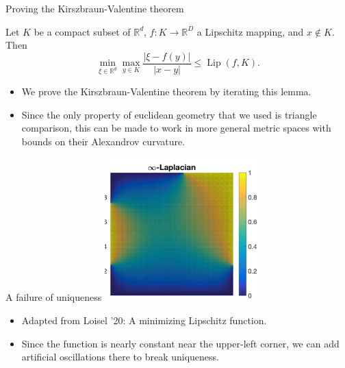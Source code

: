 \documentclass[10pt]{beamer}
\newcommand{\RR}{\mathbb{R}}
\DeclareMathOperator{\Lip}{Lip}
\begin{document}
\begin{frame}{Proving the Kirszbraun-Valentine theorem}
\begin{lemma}
Let $K$ be a compact subset of $\RR^d$, $f: K \to \RR^D$ a Lipschitz mapping, and $x \notin K$.
Then
$$\min_{\xi \in \RR^d} \max_{y \in K} \frac{|\xi - f(y)|}{|x - y|} \leq \Lip(f, K).$$
\end{lemma} 

\begin{itemize}
\item We prove the Kirszbraun-Valentine theorem by iterating this lemma. 
\item Since the only property of euclidean geometry that we used is triangle comparison, this can be made to work in more general metric spaces with bounds on their Alexandrov curvature.
\end{itemize}
\end{frame}

\begin{frame}{A failure of uniqueness}
    \centering 
    \includegraphics[width=6cm]{KirszbraunValentine.png}
    
\begin{itemize}
\item Adapted from Loisel '20: A minimizing Lipschitz function.  
\item Since the function is nearly constant near the upper-left corner, we can add artificial oscillations there to break uniqueness.
\end{itemize}
\end{frame}
\end{document}
